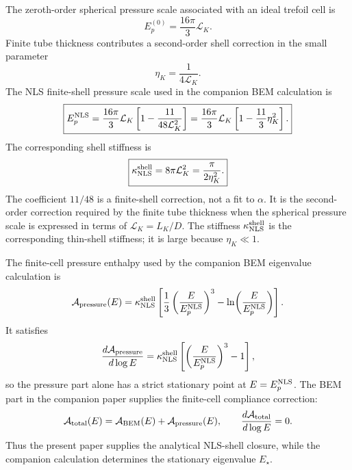 \documentclass[11pt]{article}
\newcommand{\EpNLS}{E_p^{\rm NLS}}
\newcommand{\kappaNLS}{\kappa_{\rm NLS}^{\rm shell}}
\begin{document}
The zeroth-order spherical pressure scale associated with an ideal trefoil cell is
\begin{equation}
  E_p^{(0)}
  =
  \frac{16\pi}{3}\mathcal L_K.
  \label{eq:Ep0}
\end{equation}
Finite tube thickness contributes a second-order shell correction in the small parameter
\begin{equation}
  \eta_K=\frac{1}{4\mathcal L_K}.
  \label{eq:eta-nls}
\end{equation}
The NLS finite-shell pressure scale used in the companion BEM calculation is
\begin{equation}
  \boxed{
  \EpNLS
  =
  \frac{16\pi}{3}\mathcal L_K
  \left[
  1-\frac{11}{48\mathcal L_K^2}
  \right]
  =
  \frac{16\pi}{3}\mathcal L_K
  \left[
  1-\frac{11}{3}\eta_K^2
  \right].
  }
  \label{eq:EpNLS}
\end{equation}
The corresponding shell stiffness is
\begin{equation}
  \boxed{
  \kappaNLS
  =
  8\pi\mathcal L_K^2
  =
  \frac{\pi}{2\eta_K^2}.
  }
  \label{eq:kappaNLS}
\end{equation}
The coefficient \(11/48\) is a finite-shell correction, not a fit to \(\alpha\).  It is the
second-order correction required by the finite tube thickness when the spherical pressure
scale is expressed in terms of \(\mathcal L_K=L_K/D\).  The stiffness
\(\kappa_{\rm NLS}^{\rm shell}\) is the corresponding thin-shell stiffness; it is large
because \(\eta_K\ll1\).

The finite-cell pressure enthalpy used by the companion BEM eigenvalue calculation is
\begin{equation}
  \mathcal A_{\rm pressure}(E)
  =
  \kappaNLS
  \left[
    \frac{1}{3}\left(\frac{E}{\EpNLS}\right)^3
    -
    \ln\!\left(\frac{E}{\EpNLS}\right)
  \right].
  \label{eq:pressure-action-nls}
\end{equation}
It satisfies
\begin{equation}
  \frac{d\mathcal A_{\rm pressure}}{d\log E}
  =
  \kappaNLS
  \left[
    \left(\frac{E}{\EpNLS}\right)^3-1
  \right],
  \label{eq:pressure-derivative-nls}
\end{equation}
so the pressure part alone has a strict stationary point at \(E=\EpNLS\).  The BEM part in
the companion paper supplies the finite-cell compliance correction:
\begin{equation}
  \mathcal A_{\rm total}(E)
  =
  \mathcal A_{\rm BEM}(E)
  +
  \mathcal A_{\rm pressure}(E),
  \qquad
  \frac{d\mathcal A_{\rm total}}{d\log E}=0.
  \label{eq:total-action-nls}
\end{equation}
Thus the present paper supplies the analytical NLS-shell closure, while the companion
calculation determines the stationary eigenvalue \(E_\star\).
\end{document}
